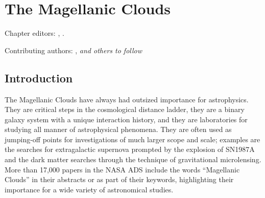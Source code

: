
\chapter{The Magellanic Clouds}
\def\chpname{mc}\label{chp:\chpname}

Chapter editors:
,
.

Contributing authors:
,
{\it and others to follow}


\section{Introduction}
\label{sec:\chpname:intro}




The Magellanic Clouds have always had outsized importance for
astrophysics.  They are critical steps in the cosmological distance
ladder, they are a binary galaxy system with a unique interaction
history, and they are laboratories for studying all manner of
astrophysical phenomena.  They are often used as jumping-off points
for investigations of much larger scope and scale; examples are the
searches for extragalactic supernova prompted by the explosion of
SN1987A and the dark matter searches through the technique of
gravitational microlensing.  More than 17,000 papers in the NASA ADS
include the words ``Magellanic Clouds'' in their abstracts or as part
of their keywords, highlighting their importance for a wide variety of
astronomical studies.

